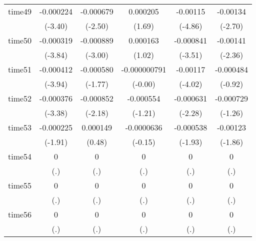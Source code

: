 \begin{table}[htbp]
\begin{tabular}{l*{5}{c}}
time49      &   -0.000224\sym{***}&   -0.000679\sym{*}  &    0.000205         &    -0.00115\sym{***}&    -0.00134\sym{**} \\
            &     (-3.40)         &     (-2.50)         &      (1.69)         &     (-4.86)         &     (-2.70)         \\
time50      &   -0.000319\sym{***}&   -0.000889\sym{**} &    0.000163         &   -0.000841\sym{***}&    -0.00141\sym{*}  \\
            &     (-3.84)         &     (-3.00)         &      (1.02)         &     (-3.51)         &     (-2.36)         \\
time51      &   -0.000412\sym{***}&   -0.000580         &-0.000000791         &    -0.00117\sym{***}&   -0.000484         \\
            &     (-3.94)         &     (-1.77)         &     (-0.00)         &     (-4.02)         &     (-0.92)         \\
time52      &   -0.000376\sym{***}&   -0.000852\sym{*}  &   -0.000554         &   -0.000631\sym{*}  &   -0.000729         \\
            &     (-3.38)         &     (-2.18)         &     (-1.21)         &     (-2.28)         &     (-1.26)         \\
time53      &   -0.000225         &    0.000149         &  -0.0000636         &   -0.000538         &    -0.00123         \\
            &     (-1.91)         &      (0.48)         &     (-0.15)         &     (-1.93)         &     (-1.86)         \\
time54      &           0         &           0         &           0         &           0         &           0         \\
            &         (.)         &         (.)         &         (.)         &         (.)         &         (.)         \\
time55      &           0         &           0         &           0         &           0         &           0         \\
            &         (.)         &         (.)         &         (.)         &         (.)         &         (.)         \\
time56      &           0         &           0         &           0         &           0         &           0         \\
            &         (.)         &         (.)         &         (.)         &         (.)         &         (.)         \\

\end{tabular}
\end{table}
